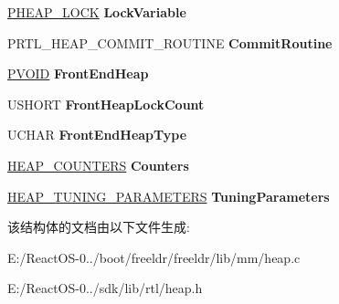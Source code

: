 \begin{DoxyCompactItemize}
\begin{tabbing}
\end{tabbing}\item 
\mbox{\label{struct___h_e_a_p_acfe3c82c756a9593062e9854e2615ad8}} 
\hyperlink{struct___h_e_a_p___l_o_c_k}{P\+H\+E\+A\+P\+\_\+\+L\+O\+CK} {\bfseries Lock\+Variable}
\item 
\mbox{\label{struct___h_e_a_p_a3feaf6411b3cde3ee3c820c76084770a}} 
P\+R\+T\+L\+\_\+\+H\+E\+A\+P\+\_\+\+C\+O\+M\+M\+I\+T\+\_\+\+R\+O\+U\+T\+I\+NE {\bfseries Commit\+Routine}
\item 
\mbox{\label{struct___h_e_a_p_ad90fb1b8ce07e2b6ba2e9d50fc940f8e}} 
\hyperlink{interfacevoid}{P\+V\+O\+ID} {\bfseries Front\+End\+Heap}
\item 
\mbox{\label{struct___h_e_a_p_aefa7c6385249e72ab4c21a71fa745f9e}} 
U\+S\+H\+O\+RT {\bfseries Front\+Heap\+Lock\+Count}
\item 
\mbox{\label{struct___h_e_a_p_a7ab7cf16afb3d36c8ef9695e08231866}} 
U\+C\+H\+AR {\bfseries Front\+End\+Heap\+Type}
\item 
\mbox{\label{struct___h_e_a_p_a3f31b33278bf4693bbc28d50c3b2c9b9}} 
\hyperlink{struct___h_e_a_p___c_o_u_n_t_e_r_s}{H\+E\+A\+P\+\_\+\+C\+O\+U\+N\+T\+E\+RS} {\bfseries Counters}
\item 
\mbox{\label{struct___h_e_a_p_acb947387ed8b20cc3367ba52aad3882c}} 
\hyperlink{struct___h_e_a_p___t_u_n_i_n_g___p_a_r_a_m_e_t_e_r_s}{H\+E\+A\+P\+\_\+\+T\+U\+N\+I\+N\+G\+\_\+\+P\+A\+R\+A\+M\+E\+T\+E\+RS} {\bfseries Tuning\+Parameters}
\end{DoxyCompactItemize}


该结构体的文档由以下文件生成\+:\begin{DoxyCompactItemize}
\item 
E\+:/\+React\+O\+S-\/0../boot/freeldr/freeldr/lib/mm/heap.\+c\item 
E\+:/\+React\+O\+S-\/0../sdk/lib/rtl/heap.\+h\end{DoxyCompactItemize}
